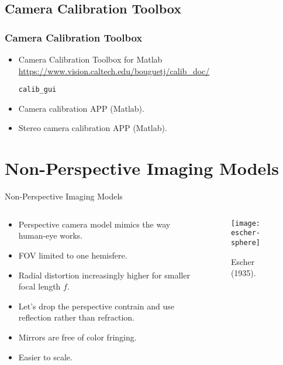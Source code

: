 \subsection{Camera Calibration Toolbox}

\begin{frame}[fragile]
\frametitle{Camera Calibration Toolbox}
\begin{itemize}
\item Camera Calibration Toolbox for Matlab \url{https://www.vision.caltech.edu/bouguetj/calib_doc/}
\begin{lstlisting}
calib_gui
\end{lstlisting}
\item Camera calibration APP (Matlab).
\item Stereo camera calibration APP (Matlab).
\end{itemize}
\end{frame}

\section{Non-Perspective Imaging Models}

\begin{frame}
Non-Perspective Imaging Models
\begin{columns}
\begin{column}{.5\textwidth}
\begin{itemize}
\item Perspective camera model mimics the way human-eye works.
\item FOV limited to one hemisfere.
\item Radial distortion increasingly higher for smaller focal length $f$.
\item Let's drop the perspective contrain and use reflection rather than refraction.
\item Mirrors are free of color fringing.
\item Easier to scale.
\end{itemize}
\end{column}
\begin{column}{.5\textwidth}
\begin{figure}[!h]
\centering
\texttt{[image: escher-sphere]}
\caption{Escher (1935).}
\end{figure}
\end{column}
\end{columns}
\end{frame}

